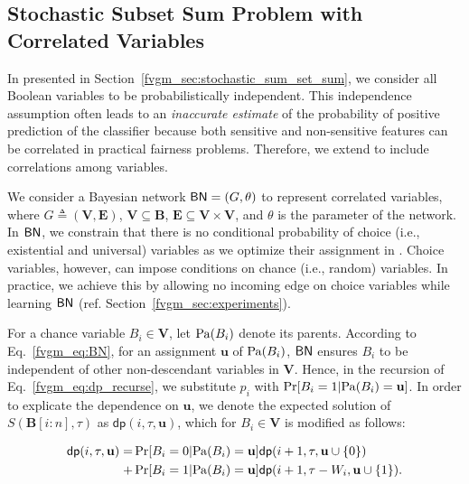 	
\subsection{Stochastic Subset Sum Problem with Correlated Variables} 
\label{fvgm_sec:dp_with_BN}
In {\stochastic} presented in Section~\ref{fvgm_sec:stochastic_sum_set_sum}, we consider all  Boolean variables to be probabilistically independent. This independence assumption often leads to an \textit{inaccurate estimate} of the probability of positive prediction of the classifier because both sensitive and non-sensitive features can be correlated in practical fairness problems. Therefore, we extend {\stochastic} to include correlations among variables.

We consider a Bayesian network $ \mathsf{BN} = (G, \theta) $ to represent correlated variables, where $ G \triangleq (\mathbf{V}, \mathbf{E}) $, $ \mathbf{V} \subseteq \mathbf{B} $, $ \mathbf{E} \subseteq \mathbf{V} \times \mathbf{V}  $, and $ \theta $ is the parameter of the network.  In  $ \mathsf{BN} $, we constrain that there is no conditional probability of choice (i.e., existential and universal) variables as we optimize their assignment in {\stochastic}. Choice variables, however, can impose conditions on chance (i.e., random) variables. In practice, we achieve this by allowing no incoming edge on choice variables while learning $ \mathsf{BN} $ (ref. Section~\ref{fvgm_sec:experiments}).
   	
   	

For a chance variable $ B_i \in \mathbf{V} $, let $ \mathrm{Pa}(B_i) $ denote its parents. According to Eq.~\eqref{fvgm_eq:BN},  for an assignment $ \mathbf{u} $ of $ \mathrm{Pa}(B_i) $, $ \mathsf{BN} $ ensures $ B_i $ to be independent of other non-descendant variables in $ \mathbf{V} $. Hence, in the recursion of Eq.~\eqref{fvgm_eq:dp_recurse}, we substitute  $ p_i $  with  $ \Pr[B_i = 1| \mathrm{Pa}(B_i) = \mathbf{u}] $. In order to explicate the dependence on $ \mathbf{u} $, we denote the expected solution of $ S(\mathbf{B}[i:n], \tau) $ as 
$ \mathsf{dp}(i, \tau, \mathbf{u}) $, which for $ B_i \in \mathbf{V} $ is modified as follows:

\begin{align*}
	\mathsf{dp}(i,  \tau, \mathbf{u}) = & \Pr[B_i = 0| \mathrm{Pa}(B_i) = \mathbf{u}] \mathsf{dp}(i+1, \tau, \mathbf{u} \cup \{0\})  \\
	 + & \Pr[B_i = 1| \mathrm{Pa}(B_i) = \mathbf{u}]  \mathsf{dp}(i+1, \tau-W_i, \mathbf{u} \cup \{1\}).
\end{align*}

